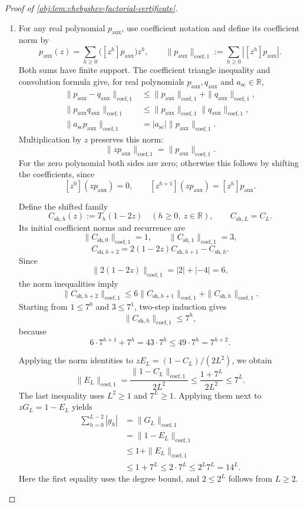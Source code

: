 \begin{proof}[Proof of \cref{obj:lem:chebyshev-factorial-certificate}]
\begin{enumerate}
\item For any real polynomial \(p_{\mathrm{aux}}\), use coefficient notation and define its coefficient norm by
\[
p_{\mathrm{aux}}(z)
 =\sum_{h\ge0}\bigl([z^h]p_{\mathrm{aux}}\bigr)z^h,
\qquad
\|p_{\mathrm{aux}}\|_{\mathrm{coef},1}
 :=\sum_{h\ge0}|[z^h]p_{\mathrm{aux}}|.
\]
Both sums have finite support. The coefficient triangle inequality and convolution formula give, for real polynomials \(p_{\mathrm{aux}},q_{\mathrm{aux}}\) and \(a_{\mathrm{sc}}\in\mathbb R\),
\[
\begin{aligned}
\|p_{\mathrm{aux}}-q_{\mathrm{aux}}\|_{\mathrm{coef},1}
 &\le \|p_{\mathrm{aux}}\|_{\mathrm{coef},1}
      +\|q_{\mathrm{aux}}\|_{\mathrm{coef},1},\\
\|p_{\mathrm{aux}}q_{\mathrm{aux}}\|_{\mathrm{coef},1}
 &\le \|p_{\mathrm{aux}}\|_{\mathrm{coef},1}
       \|q_{\mathrm{aux}}\|_{\mathrm{coef},1},\\
\|a_{\mathrm{sc}}p_{\mathrm{aux}}\|_{\mathrm{coef},1}
 &=|a_{\mathrm{sc}}|\|p_{\mathrm{aux}}\|_{\mathrm{coef},1}.
\end{aligned}
\]
Multiplication by \(z\) preserves this norm:
\[
\|zp_{\mathrm{aux}}\|_{\mathrm{coef},1}
 =\|p_{\mathrm{aux}}\|_{\mathrm{coef},1}.
\]
For the zero polynomial both sides are zero; otherwise this follows by shifting the coefficients, since
\[
[z^0](zp_{\mathrm{aux}})=0,\qquad
[z^{h+1}](zp_{\mathrm{aux}})=[z^h]p_{\mathrm{aux}}.
\]

Define the shifted family
\[
C_{\mathrm{sh},h}(z):=T_h(1-2z)
\quad(h\ge0,\ z\in\mathbb R),
\qquad C_{\mathrm{sh},L}=C_L.
\]
Its initial coefficient norms and recurrence are
\[
\|C_{\mathrm{sh},0}\|_{\mathrm{coef},1}=1,\qquad
\|C_{\mathrm{sh},1}\|_{\mathrm{coef},1}=3,
\]
\[
C_{\mathrm{sh},h+2}
 =2(1-2z)C_{\mathrm{sh},h+1}-C_{\mathrm{sh},h}.
\]
Since
\[
\|2(1-2z)\|_{\mathrm{coef},1}=|2|+|-4|=6,
\]
the norm inequalities imply
\[
\|C_{\mathrm{sh},h+2}\|_{\mathrm{coef},1}
 \le6\|C_{\mathrm{sh},h+1}\|_{\mathrm{coef},1}
    +\|C_{\mathrm{sh},h}\|_{\mathrm{coef},1}.
\]
Starting from \(1\le7^0\) and \(3\le7^1\), two-step induction gives
\[
\|C_{\mathrm{sh},h}\|_{\mathrm{coef},1}\le7^h,
\]
because
\[
6\cdot7^{h+1}+7^h
 =43\cdot7^h
 \le49\cdot7^h
 =7^{h+2}.
\]

Applying the norm identities to \(zE_L=(1-C_L)/(2L^2)\), we obtain
\[
\|E_L\|_{\mathrm{coef},1}
 =\frac{\|1-C_L\|_{\mathrm{coef},1}}{2L^2}
 \le\frac{1+7^L}{2L^2}
 \le7^L.
\]
The last inequality uses \(L^2\ge1\) and \(7^L\ge1\). Applying them next to \(zG_L=1-E_L\) yields
\[
\begin{aligned}
\sum_{h=0}^{L-2}|g_h|
 &=\|G_L\|_{\mathrm{coef},1}\\
 &=\|1-E_L\|_{\mathrm{coef},1}\\
 &\le1+\|E_L\|_{\mathrm{coef},1}\\
 &\le1+7^L
 \le2\cdot7^L
 \le2^L7^L
 =14^L.
\end{aligned}
\]
Here the first equality uses the degree bound, and \(2\le2^L\) follows from \(L\ge2\).


\end{enumerate}
\end{proof}
